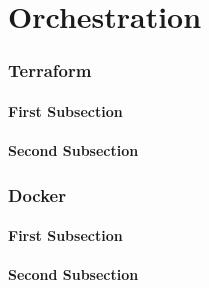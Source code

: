 \documentclass[./FDA_document_template.tex]{subfiles}
\begin{document}
\renewcommand{\onlyinsubfile}[1]{#1}
\renewcommand{\notinsubfile}[1]{}
 
\setcounter{part}{7}
\pagestyle{Orchestration}

\part{Orchestration}
 
 
 
 \section{Terraform}

\lipsum[1]

\subsection{First Subsection}

\lipsum[2]

\subsection{Second Subsection}

\lipsum[3]
 
 
 \section{Docker}

\lipsum[1]

\subsection{First Subsection}

\lipsum[2]

\subsection{Second Subsection}

\lipsum[3]

\bigskip
 
\end{document}

